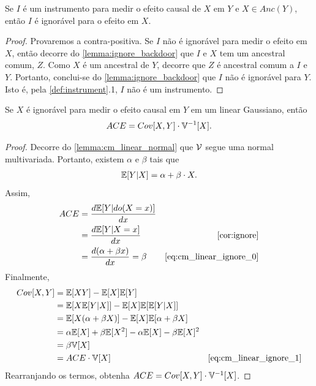 \begin{lemma}
 \label{lemma:instrument_ignore}
 Se $I$ é um instrumento para medir 
 o efeito causal de $X$ em $Y$ e
 $X \in Anc(Y)$, então
 $I$ é ignorável para o efeito em $X$.
\end{lemma}

\begin{proof}
 Provaremos a contra-positiva.
 Se $I$ não é ignorável para medir o efeito em $X$,
 então decorre do \cref{lemma:ignore_backdoor} que
 $I$ e $X$ tem um ancestral comum, $Z$.
 Como $X$ é um ancestral de $Y$,
 decorre que $Z$ é ancestral comum a $I$ e $Y$.
 Portanto, conclui-se do \cref{lemma:ignore_backdoor} que
 $I$ não é ignorável para $Y$.
 Isto é, pela \cref{def:instrument}.1,
 $I$ não é um instrumento.
\end{proof}

\begin{lemma}
 \label{lemma:cm_linear_ignore}
 Se $X$ é ignorável para medir
 o efeito causal em $Y$ em um
 \CM linear Gaussiano, então
 \begin{align*}
  {ACE} = Cov[X,Y] \cdot {\mathbb V}^{-1}[X].
 \end{align*}
\end{lemma}

\begin{proof}
 Decorre do \cref{lemma:cm_linear_normal} que
 ${\mathcal V}$ segue uma normal multivariada.
 Portanto, existem $\alpha$ e $\beta$ tais que
 \begin{align}
  \label{eq:cm_linear_ignore_0}
  {\mathbb E}[Y|X] = \alpha + \beta \cdot X.
 \end{align}
 Assim,
 \begin{align}
  \label{eq:cm_linear_ignore_1}
  \ACE &= \frac{d\E[Y|do(X=x)]}{dx} \nonumber \\
  &= \frac{d\E[Y|X=x]}{dx}
  & \text{\cref{cor:ignore}} \nonumber \\
  &= \frac{d(\alpha + \beta x)}{dx} = \beta
  & \text{\cref{eq:cm_linear_ignore_0}}
 \end{align}
 Finalmente,
 \begin{align*}
  Cov[X,Y]
  &= \E[XY] - \E[X]\E[Y] \\
  &= \E[X\E[Y|X]] - \E[X]\E[\E[Y|X]] \\
  &= \E[X(\alpha + \beta X)] - \E[X] \E[\alpha + \beta X] \\
  &= \alpha \E[X] + \beta \E[X^2] - \alpha \E[X] - \beta \E[X]^2 \\
  &= \beta \V[X] \\
  &= \ACE \cdot \V[X]
  & \text{\cref{eq:cm_linear_ignore_1}}
 \end{align*}
 Rearranjando os termos, obtenha 
 ${ACE} = Cov[X,Y] \cdot {\mathbb V}^{-1}[X]$.
\end{proof}

